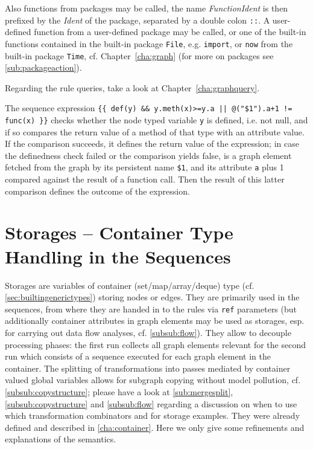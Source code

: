 Also functions from packages may be called, the name \emph{FunctionIdent} is then prefixed by the \emph{Ident} of the package, separated by a double colon \texttt{::}.
A user-defined function from a user-defined package may be called, or one of the built-in functions contained in the built-in package \texttt{File}, e.g. \texttt{import}, or \texttt{now} from the built-in package \texttt{Time}, cf. Chapter~\ref{cha:graph} (for more on packages see \ref{sub:packageaction}).

Regarding the rule queries, take a look at Chapter~\ref{cha:graphquery}.

\begin{example}
The sequence expression \verb#{{ def(y) && y.meth(x)>=y.a || @("$1").a+1 != func(x) }}# checks whether the node typed variable \texttt{y} is defined, i.e. not null, and if so compares the return value of a method of that type with an attribute value. If the comparison succeeds, it defines the return value of the expression; in case the definedness check failed or the comparison yields false, is a graph element fetched from the graph by its persistent name \verb#$1#, and its attribute \texttt{a} plus 1 compared against the result of a function call. Then the result of this latter comparison defines the outcome of the expression.
\end{example}


\section{Storages -- Container Type Handling in the Sequences}\label{sec:storages}
Storages are variables of container (set/map/array/deque) type (cf. \ref{sec:builtingenerictypes}) storing nodes or edges.
They are primarily used in the sequences, from where they are handed in to the rules via \texttt{ref} parameters (but additionally container attributes in graph elements may be used as storages,
esp. for carrying out data flow analyses, cf. \ref{subsub:flow}).
They allow to decouple processing phases: the first run collects all graph elements relevant for the second run which consists of a sequence executed for each graph element in the container.
The splitting of transformations into passes mediated by container valued global variables allows for subgraph copying without model pollution, cf. \ref{subsub:copystructure}; please have a look at \ref{sub:mergesplit}, \ref{subsub:copystructure} and \ref{subsub:flow} regarding a discussion on when to use which transformation combinators and for storage examples.
They were already defined and described in \ref{cha:container}.
Here we only give some refinements and explanations of the semantics.

